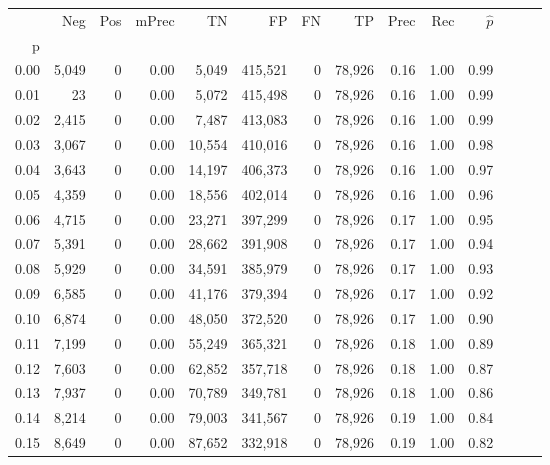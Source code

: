 \begin{tabular}{rrrrrrrrrrrrrr}
\toprule
{} &    Neg &    Pos & mPrec &       TN &       FP &      FN &      TP &  Prec &   Rec & $\hat{p}$ \\
p    &        &        &       &          &          &         &         &       &       &           \\
\midrule
0.00 &  5,049 &      0 &  0.00 &    5,049 &  415,521 &       0 &  78,926 &  0.16 &  1.00 &      0.99 \\
0.01 &     23 &      0 &  0.00 &    5,072 &  415,498 &       0 &  78,926 &  0.16 &  1.00 &      0.99 \\
0.02 &  2,415 &      0 &  0.00 &    7,487 &  413,083 &       0 &  78,926 &  0.16 &  1.00 &      0.99 \\
0.03 &  3,067 &      0 &  0.00 &   10,554 &  410,016 &       0 &  78,926 &  0.16 &  1.00 &      0.98 \\
0.04 &  3,643 &      0 &  0.00 &   14,197 &  406,373 &       0 &  78,926 &  0.16 &  1.00 &      0.97 \\
0.05 &  4,359 &      0 &  0.00 &   18,556 &  402,014 &       0 &  78,926 &  0.16 &  1.00 &      0.96 \\
0.06 &  4,715 &      0 &  0.00 &   23,271 &  397,299 &       0 &  78,926 &  0.17 &  1.00 &      0.95 \\
0.07 &  5,391 &      0 &  0.00 &   28,662 &  391,908 &       0 &  78,926 &  0.17 &  1.00 &      0.94 \\
0.08 &  5,929 &      0 &  0.00 &   34,591 &  385,979 &       0 &  78,926 &  0.17 &  1.00 &      0.93 \\
0.09 &  6,585 &      0 &  0.00 &   41,176 &  379,394 &       0 &  78,926 &  0.17 &  1.00 &      0.92 \\
0.10 &  6,874 &      0 &  0.00 &   48,050 &  372,520 &       0 &  78,926 &  0.17 &  1.00 &      0.90 \\
0.11 &  7,199 &      0 &  0.00 &   55,249 &  365,321 &       0 &  78,926 &  0.18 &  1.00 &      0.89 \\
0.12 &  7,603 &      0 &  0.00 &   62,852 &  357,718 &       0 &  78,926 &  0.18 &  1.00 &      0.87 \\
0.13 &  7,937 &      0 &  0.00 &   70,789 &  349,781 &       0 &  78,926 &  0.18 &  1.00 &      0.86 \\
0.14 &  8,214 &      0 &  0.00 &   79,003 &  341,567 &       0 &  78,926 &  0.19 &  1.00 &      0.84 \\
0.15 &  8,649 &      0 &  0.00 &   87,652 &  332,918 &       0 &  78,926 &  0.19 &  1.00 &      0.82 \\

\end{tabular}
